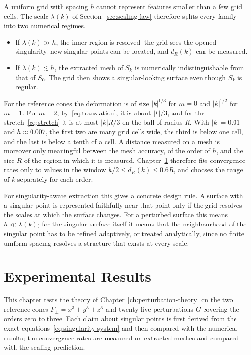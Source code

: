 \documentclass[12pt, a4paper, oneside]{book}
\theoremstyle{plain}
\theoremstyle{definition}
\theoremstyle{remark}
\begin{document}
A uniform grid with spacing $h$ cannot represent features smaller than a few
grid cells. The scale $\lambda(k)$ of Section~\ref{sec:scaling-law} therefore
splits every family into two numerical regimes.
\begin{itemize}
    \item If $\lambda(k)\gg h$, the inner region is resolved: the grid sees the
          opened singularity, new singular points can be located, and $d_R(k)$
          can be measured.
    \item If $\lambda(k)\lesssim h$, the extracted mesh of $S_k$ is
          numerically indistinguishable from that of $S_0$. The grid then shows
          a singular-looking surface even though $S_k$ is regular.
\end{itemize}
For the reference cones the deformation is of size $|k|^{1/3}$ for $m=0$ and
$|k|^{1/2}$ for $m=1$. For $m=2$, by~\eqref{eq:translation}, it is about
$|k|/3$, and for the stretch~\eqref{eq:stretch} it is at most $|k|R/3$ on the
ball of radius $R$. With $|k|=0.01$ and $h\approx0.007$, the first two are many
grid cells wide, the third is below one cell, and the last is below a tenth of
a cell. A distance measured on a mesh is moreover only meaningful between the
mesh accuracy, of the order of $h$, and the size $R$ of the region in which it
is measured. Chapter~\ref{ch:experimental-results} therefore fits convergence
rates only to values in the window $h/2\le d_R(k)\le0.6R$, and chooses the
range of $k$ separately for each order.

For singularity-aware extraction this gives a concrete design rule. A surface
with a singular point is represented faithfully near that point only if the
grid resolves the scales at which the surface changes. For a perturbed surface
this means $h\ll\lambda(k)$; for the singular surface itself it means that the
neighbourhood of the singular point has to be refined adaptively, or treated
analytically, since no finite uniform spacing resolves a structure that exists
at every scale.


\chapter{Experimental Results}
\label{ch:experimental-results}

This chapter tests the theory of Chapter~\ref{ch:perturbation-theory} on the
two reference cones $F_\pm=x^3+y^3\pm z^3$ and twenty-five perturbations $G$
covering the orders zero to three. Each claim about singular points is first
derived from the exact equations~\eqref{eq:singularity-system} and then compared
with the numerical results; the convergence rates are measured on extracted
meshes and compared with the scaling prediction.
\end{document}

